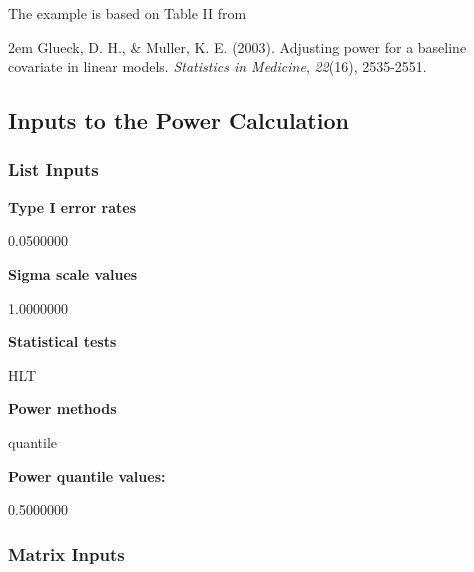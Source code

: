\documentclass{glimmpse-report}
\begin{document}
The example is based on Table II from

\hangindent2em
 Glueck, D. H., \& Muller, K. E. (2003). Adjusting power for a baseline covariate in linear models. \emph{Statistics in Medicine}, \emph{22}(16), 2535-2551.


\subsection{Inputs to the Power Calculation}
\subsubsection{List Inputs}

{\bf Type I error rates}

0.0500000

{\bf Sigma scale values}

1.0000000

{\bf Statistical tests}

HLT

{\bf Power methods}

quantile

{\bf Power quantile values:}

0.5000000

\subsubsection{Matrix Inputs}
\end{document}

